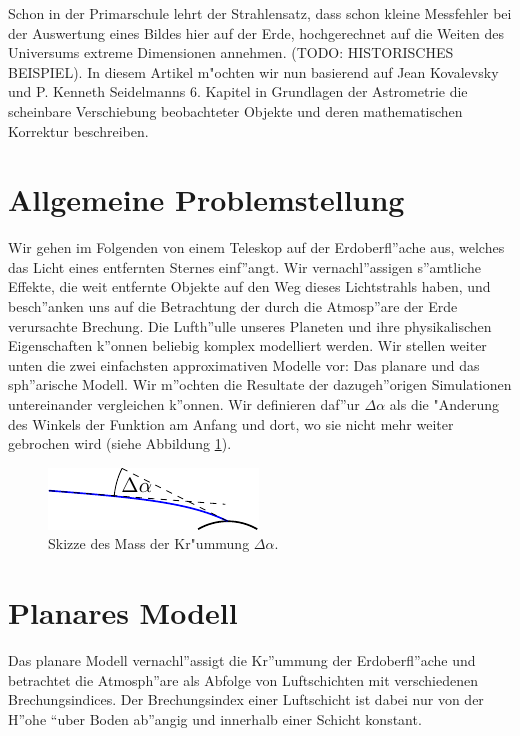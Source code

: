 \begin{refsection}
Schon in der Primarschule lehrt der Strahlensatz, dass schon kleine Messfehler bei der Auswertung eines Bildes hier auf der Erde, hochgerechnet auf die Weiten des Universums extreme Dimensionen annehmen. (TODO: HISTORISCHES BEISPIEL). 
In diesem Artikel m"ochten wir nun basierend auf Jean Kovalevsky und P. Kenneth Seidelmanns 6. Kapitel in Grundlagen der Astrometrie \cite[p. 121ff]{licht:astrometry} die scheinbare Verschiebung beobachteter Objekte und deren mathematischen Korrektur beschreiben. 

\section{Allgemeine Problemstellung}
Wir gehen im Folgenden von einem Teleskop auf der Erdoberfl''ache aus, welches das Licht eines entfernten Sternes einf''angt. 
Wir vernachl''assigen s''amtliche Effekte, die weit entfernte Objekte auf den Weg dieses Lichtstrahls haben, und besch''anken uns auf die Betrachtung der durch die Atmosp''are der Erde verursachte Brechung.
Die Lufth''ulle unseres Planeten und ihre physikalischen Eigenschaften k''onnen beliebig komplex modelliert werden. 
Wir stellen weiter unten die zwei einfachsten approximativen Modelle vor: Das planare und das sph''arische Modell.
Wir m''ochten die Resultate der dazugeh''origen Simulationen untereinander vergleichen k''onnen. 
Wir definieren daf''ur $\Delta \alpha$ als die "Anderung des Winkels der Funktion am Anfang und dort, wo sie nicht mehr weiter gebrochen wird (siehe Abbildung \ref{fig:skizze_mass}). 

\begin{figure}
  \centering
  \includegraphics{licht/standalone/fig_delta_alpha.pdf}
  \caption{Skizze des Mass der Kr"ummung $\Delta \alpha$. \label{fig:skizze_mass}}
\end{figure}

\section{Planares Modell} 

Das planare Modell vernachl''assigt die Kr''ummung der Erdoberfl''ache und betrachtet die Atmosph''are als Abfolge von Luftschichten mit verschiedenen Brechungsindices. 
Der Brechungsindex einer Luftschicht ist dabei nur von der H''ohe ``uber Boden ab''angig und innerhalb einer Schicht konstant.


\end{refsection}

